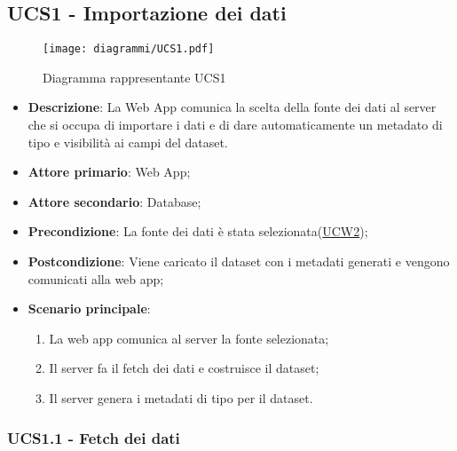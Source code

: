 \subsection{UCS1 - Importazione dei dati}
\label{sub:ucs1}


\begin{figure}[h]
	\centering
	\texttt{[image: diagrammi/UCS1.pdf]}
	\caption{Diagramma rappresentante UCS1}
	\label{fig:UCS1}
\end{figure}

\begin{itemize}
	\item \textbf{Descrizione}: La Web App comunica la scelta della fonte dei dati al server che si occupa di importare i dati e di dare automaticamente un metadato di tipo e visibilità ai campi del dataset.

	\item \textbf{Attore primario}: Web App;
	\item \textbf{Attore secondario}: Database;

	\item \textbf{Precondizione}:   La fonte dei dati è stata selezionata(\hyperref[sub:ucw2]{UCW2});

	\item \textbf{Postcondizione}:  Viene caricato il dataset con i metadati generati e vengono comunicati alla web app;

	\item \textbf{Scenario principale}:
	      \begin{enumerate}
		      \item La web app comunica al server la fonte selezionata;
		      \item Il server fa il fetch dei dati e costruisce il dataset;
		      \item Il server genera i metadati di tipo per il dataset.
	      \end{enumerate}

\end{itemize}

\subsubsection{UCS1.1 - Fetch dei dati}
\label{ssub:ucs1.1}

